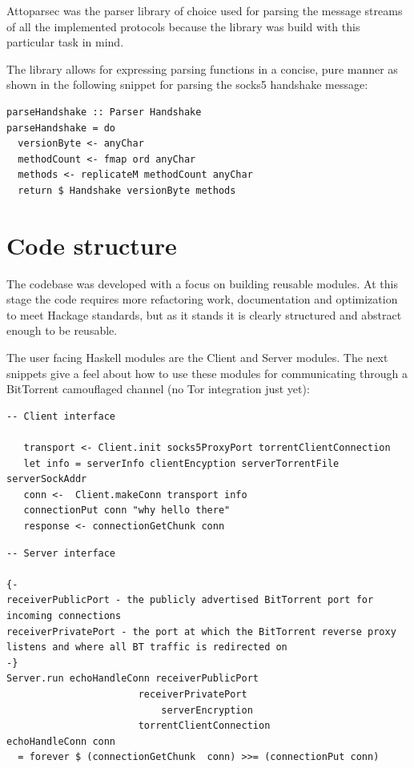 \documentclass[11pt]{book} %
\begin{document}
Attoparsec was the parser library of choice used for parsing the message streams of all the implemented protocols because the library was build with this particular task in mind.

The library allows for expressing parsing functions in a concise, pure manner as shown in the following snippet for parsing the socks5 handshake message:

\begin{lstlisting}
parseHandshake :: Parser Handshake
parseHandshake = do
  versionByte <- anyChar
  methodCount <- fmap ord anyChar
  methods <- replicateM methodCount anyChar
  return $ Handshake versionByte methods
\end{lstlisting}

\section{Code structure}

The codebase was developed with a focus on building reusable modules. At this stage the code requires more refactoring work, documentation and optimization to meet Hackage standards, but as it stands it is clearly structured and abstract enough to be reusable.

The user facing Haskell modules are the Client and Server modules. The next snippets give a feel about how to use these modules for communicating through a BitTorrent camouflaged channel (no Tor integration just yet):

\begin{lstlisting}
-- Client interface

   transport <- Client.init socks5ProxyPort torrentClientConnection
   let info = serverInfo clientEncyption serverTorrentFile serverSockAddr
   conn <-  Client.makeConn transport info
   connectionPut conn "why hello there"
   response <- connectionGetChunk conn
\end{lstlisting}

\begin{lstlisting}
-- Server interface

{-
receiverPublicPort - the publicly advertised BitTorrent port for incoming connections
receiverPrivatePort - the port at which the BitTorrent reverse proxy listens and where all BT traffic is redirected on
-}
Server.run echoHandleConn receiverPublicPort
					   receiverPrivatePort
				           serverEncryption
					   torrentClientConnection	
echoHandleConn conn
  = forever $ (connectionGetChunk  conn) >>= (connectionPut conn)
\end{lstlisting}
\end{document}
